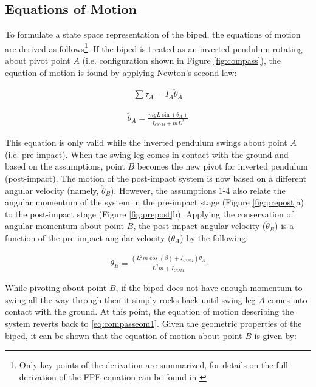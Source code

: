 \subsection{Equations of Motion}

To formulate a state space representation of the biped, the equations of motion are derived as follows\footnote{Only key points of the derivation are summarized, for details on the full derivation of the FPE equation can be found in \cite{Wight:2008vt,Millard:2011vk}}. If the biped is treated as an inverted pendulum rotating about pivot point $A$ (i.e. configuration shown in Figure  \ref{fig:compass}), the equation of motion is found by applying Newton's second law:

\begin{equation}
	\begin{aligned}
		\sum {{\tau _A} = {I_A}} {{\ddot \theta }_A}
	\end{aligned}
\end{equation}

\begin{equation} \label{eq:compasseom1}
	\begin{aligned}
		{{\ddot \theta }_A} = \frac{{mgL\sin ({\theta _A})}}{{{I_{COM}} + m{L^2}}}
	\end{aligned}
\end{equation}

This equation is only valid while the inverted pendulum swings about point $A$ (i.e. pre-impact). When the swing leg comes in contact with the ground and based on the assumptions, point $B$ becomes the new pivot for inverted pendulum (post-impact). The motion of the post-impact system is now based on a different angular velocity (namely, $\dot{\theta}_B$). However, the assumptions 1-4 also relate the angular momentum of the system in the pre-impact stage (Figure \ref{fig:prepost}a) to the post-impact stage (Figure \ref{fig:prepost}b). Applying the conservation of angular momentum about point $B$, the post-impact angular velocity ($\dot{\theta}_B$) is a function of the pre-impact angular velocity ($\dot{\theta}_A$) \cite{Wight:2008vt} by the following: 

\begin{equation}
	\begin{aligned}
		{\dot \theta _B} = \frac{{({L^2}m\cos (\beta ) + {I_{COM}}){{\dot \theta }_A}}}{{{L^2}m + {I_{COM}}}}
	\end{aligned}
\end{equation}

While pivoting about point $B$, if the biped does not have enough momentum to swing all the way through then it simply rocks back until swing leg $A$ comes into contact with the ground. At this point, the equation of motion describing the system reverts back to \eqref{eq:compasseom1}. Given the geometric properties of the biped, it can be shown that the equation of motion about point $B$ is given by: 

